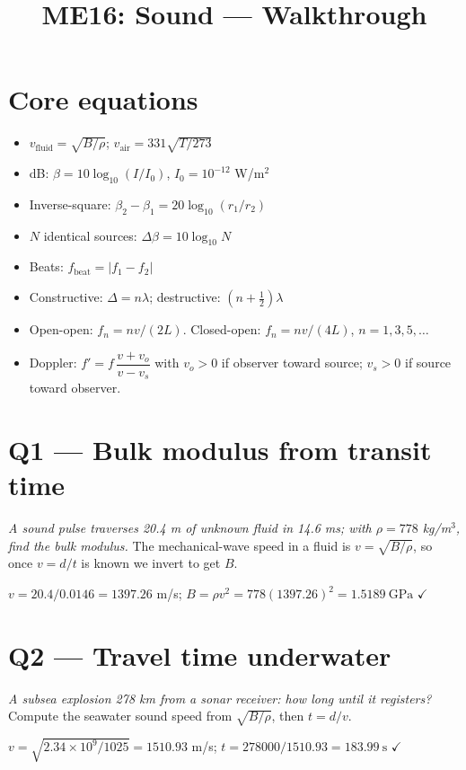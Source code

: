 \documentclass[11pt]{article}
\title{ME16: Sound --- Walkthrough}
\author{}\date{}
\newcommand{\checkmk}{\ensuremath{\checkmark}}
\begin{document}
\maketitle

\section*{Core equations}
\begin{itemize}[leftmargin=*]
\item $v_{\text{fluid}} = \sqrt{B/\rho}$; $v_{\text{air}} = 331\sqrt{T/273}$
\item dB: $\beta = 10\log_{10}(I/I_0)$, $I_0 = 10^{-12}$ W/m$^2$
\item Inverse-square: $\beta_2 - \beta_1 = 20\log_{10}(r_1/r_2)$
\item $N$ identical sources: $\Delta\beta = 10\log_{10} N$
\item Beats: $f_{\text{beat}} = |f_1 - f_2|$
\item Constructive: $\Delta = n\lambda$; destructive: $(n+\tfrac12)\lambda$
\item Open-open: $f_n = nv/(2L)$. Closed-open: $f_n = nv/(4L)$, $n=1,3,5,\dots$
\item Doppler: $f' = f\,\dfrac{v+v_o}{v-v_s}$ with $v_o>0$ if observer toward source; $v_s>0$ if source toward observer.
\end{itemize}

\section*{Q1 --- Bulk modulus from transit time}
\emph{A sound pulse traverses 20.4 m of unknown fluid in 14.6 ms; with $\rho=778$ kg/m$^3$, find the bulk modulus.} The mechanical-wave speed in a fluid is $v=\sqrt{B/\rho}$, so once $v=d/t$ is known we invert to get $B$.

$v = 20.4/0.0146 = 1397.26$ m/s; $B = \rho v^2 = 778(1397.26)^2 = \boxed{1.5189\ \text{GPa}}$ \checkmk

\section*{Q2 --- Travel time underwater}
\emph{A subsea explosion 278 km from a sonar receiver: how long until it registers?} Compute the seawater sound speed from $\sqrt{B/\rho}$, then $t=d/v$.

$v = \sqrt{2.34\times10^9/1025} = 1510.93$ m/s; $t = 278000/1510.93 = \boxed{183.99\ \text{s}}$ \checkmk
\end{document}
